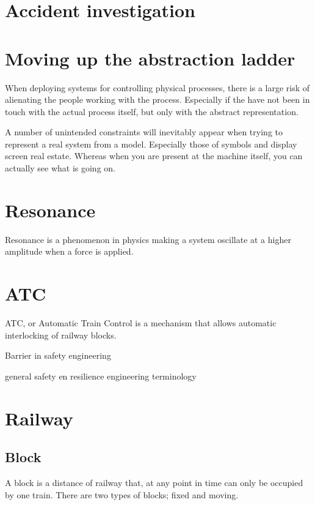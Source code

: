 \section{Accident investigation}

\section{Moving up the abstraction ladder}
When deploying systems for controlling physical processes, there is a large risk of alienating the people working with the process. Especially if the have not been in touch with the actual process itself, but only with the abstract representation.

A number of unintended constraints will inevitably appear when trying to represent a real system from a model. Especially those of symbols and display screen real estate. Whereas when you are present at the machine itself, you can actually see what is going on.

\cite{hollnagel2005joint}%

\section{Resonance}

Resonance is a phenomenon in physics making a system oscillate at a higher amplitude when a force is applied.

\section{ATC}
\label{sec:atc}
ATC, or Automatic Train Control is a mechanism that allows automatic interlocking of railway blocks.

Barrier in safety engineering

general safety en resilience engineering terminology

\section{Railway}


\subsection{Block}
A block is a distance of railway that, at any point in time can only be occupied by one train. There are two types of blocks; fixed and moving.

